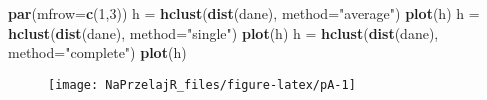 \documentclass[polish,]{book}
\newenvironment{Shaded}{\begin{snugshade}}{\end{snugshade}}
\newcommand{\DataTypeTok}[1]{\textcolor[rgb]{0.13,0.29,0.53}{#1}}
\newcommand{\DecValTok}[1]{\textcolor[rgb]{0.00,0.00,0.81}{#1}}
\newcommand{\KeywordTok}[1]{\textcolor[rgb]{0.13,0.29,0.53}{\textbf{#1}}}
\newcommand{\NormalTok}[1]{#1}
\newcommand{\StringTok}[1]{\textcolor[rgb]{0.31,0.60,0.02}{#1}}
\begin{document}
\begin{Shaded}
\begin{Highlighting}[]
\KeywordTok{par}\NormalTok{(}\DataTypeTok{mfrow=}\KeywordTok{c}\NormalTok{(}\DecValTok{1}\NormalTok{,}\DecValTok{3}\NormalTok{))}
\NormalTok{h =}\StringTok{ }\KeywordTok{hclust}\NormalTok{(}\KeywordTok{dist}\NormalTok{(dane), }\DataTypeTok{method=}\StringTok{"average"}\NormalTok{)}
\KeywordTok{plot}\NormalTok{(h)}
\NormalTok{h =}\StringTok{ }\KeywordTok{hclust}\NormalTok{(}\KeywordTok{dist}\NormalTok{(dane), }\DataTypeTok{method=}\StringTok{"single"}\NormalTok{)}
\KeywordTok{plot}\NormalTok{(h)}
\NormalTok{h =}\StringTok{ }\KeywordTok{hclust}\NormalTok{(}\KeywordTok{dist}\NormalTok{(dane), }\DataTypeTok{method=}\StringTok{"complete"}\NormalTok{)}
\KeywordTok{plot}\NormalTok{(h)}
\end{Highlighting}
\end{Shaded}

\begin{figure}[h]

{\centering \texttt{[image: NaPrzelajR\_files/figure-latex/pA-1]} 

}

\end{figure}
\end{document}
